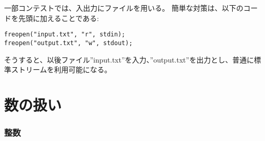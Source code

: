 一部コンテストでは、入出力にファイルを用いる。
簡単な対策は、以下のコードを先頭に加えることである:

\begin{lstlisting}
freopen("input.txt", "r", stdin);
freopen("output.txt", "w", stdout);
\end{lstlisting}

\begin{comment}
After this, the program reads the input from the file
''input.txt'' and writes the output to the file
''output.txt''.
\end{comment}

そうすると、以後ファイル''input.txt''を入力、''output.txt''を出力とし、普通に標準ストリームを利用可能になる。


\begin{comment}
\section{Working with numbers}

\index{integer}

\subsubsection{Integers}
\end{comment}

\section{数の扱い}


\subsubsection{整数}

\begin{comment}
The most used integer type in competitive programming
is \texttt{int}, which is a 32-bit type with
a value range of $-2^{31} \ldots 2^{31}-1$
or about $-2 \cdot 10^9 \ldots 2 \cdot 10^9$.
If the type \texttt{int} is not enough,
the 64-bit type \texttt{long long} can be used.
It has a value range of $-2^{63} \ldots 2^{63}-1$
or about $-9 \cdot 10^{18} \ldots 9 \cdot 10^{18}$.

The following code defines a
\texttt{long long} variable:
\begin{lstlisting}
long long x = 123456789123456789LL;
\end{lstlisting}
The suffix \texttt{LL} means that the
type of the number is \texttt{long long}.

A common mistake when using the type \texttt{long long}
is that the type \texttt{int} is still used somewhere
in the code.
For example, the following code contains
a subtle error:
\end{comment}

